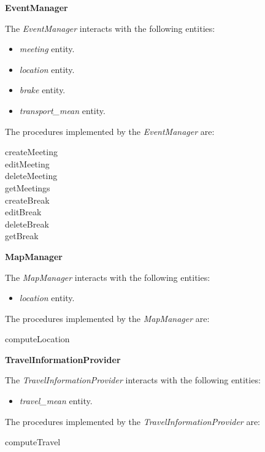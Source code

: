 \documentclass{article}
\begin{document}
	\bigskip
	\noindent
	\textbf{EventManager}

	\bigskip
	\noindent
	The \textit{EventManager} interacts with the following entities:
	\begin{itemize}
	\item \textit{meeting} entity.
	\item \textit{location} entity.
	\item \textit{brake} entity.
	\item \textit{transport\_mean} entity.
	\end{itemize}

	\bigskip
	The procedures implemented by the \textit{EventManager} are:
	\begin{description}
	\item [createMeeting]
	\item [editMeeting]
	\item [deleteMeeting]
	\item [getMeetings]
	\item [createBreak]
	\item [editBreak]
	\item [deleteBreak]
	\item [getBreak]
	\end{description}

	\bigskip
	\noindent
	\textbf{MapManager}

	\bigskip
	\noindent
	The \textit{MapManager} interacts with the following entities:
	\begin{itemize}
	\item \textit{location} entity.
	\end{itemize}

	\bigskip
	The procedures implemented by the \textit{MapManager} are:
	\begin{description}
	\item [computeLocation]
	\end{description}

	\bigskip
	\noindent
	\textbf{TravelInformationProvider}

	\bigskip
	\noindent
	The \textit{TravelInformationProvider} interacts with the following entities:
	\begin{itemize}
	\item \textit{travel\_mean} entity.
	\end{itemize}

	\bigskip
	The procedures implemented by the \textit{TravelInformationProvider} are:
	\begin{description}
	\item [computeTravel]
	\end{description}
\end{document}
